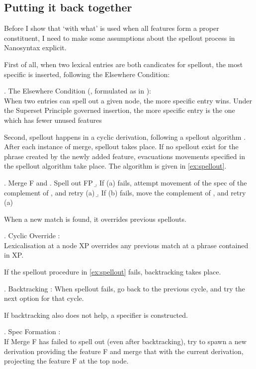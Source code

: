 \documentclass{article}
\begin{document}
\subsection{Putting it back together}

Before I show that  `with what' is used when all features form a proper constituent, I need to make some assumptions about the spellout process in Nanosyntax explicit.

First of all, when two lexical entries are both candicates for spellout, the most specific is inserted, following the Elsewhere Condition:

\ex. The Elsewhere Condition (\citealt{kiparsky1973}, formulated as in \citealt{caha2020}):\\
When two entries can spell out a given node, the more specific entry wins. Under the Superset Principle governed insertion, the more specific entry is the one which has fewer unused features

Second, spellout happens in a cyclic derivation, following a spellout algorithm \citep{starke2018}. After each instance of merge, spellout takes place. If no spellout exist for the phrase created by the newly added feature, evacuations movements specified in the spellout algorithm take place. The algorithm is given in \ref{ex:spellout}.

\ex. Merge F and \label{ex:spellout}
 \a. Spell out FP
 \b. If (a) fails, attempt movement of the spec of the complement of , and retry (a)
 \b. If (b) fails, move the complement of , and retry (a)

When a new match is found, it overrides previous spellouts.

\ex. Cyclic Override \citep{starke2018}:\\
Lexicalisation at a node XP overrides any previous match at a phrase contained in XP.

If the spellout procedure in \ref{ex:spellout} fails, backtracking takes place.

\ex. Backtracking \citep{starke2018}:
When spellout fails, go back to the previous cycle, and try the next option for that cycle.

If backtracking also does not help, a specifier is constructed.

\ex. Spec Formation \citep{starke2018}:\\
If Merge F has failed to spell out (even after backtracking), try to spawn a new derivation providing the feature F and merge that with the current derivation, projecting the feature F at the top node.
\end{document}
